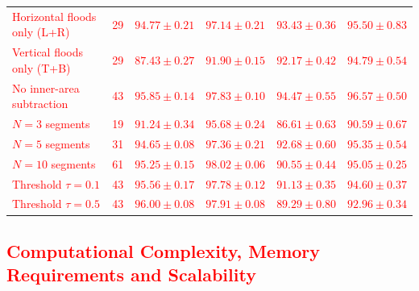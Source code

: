 \documentclass[a4paper,fleqn]{cas-dc}
\begin{document}
\begin{table}
\begin{tabular}{l|c|cc|cc}
        \textcolor{red}{Horizontal floods only (L+R)} & \textcolor{red}{29} & \textcolor{red}{$94.77 \pm 0.21$} & \textcolor{red}{$97.14 \pm 0.21$} & \textcolor{red}{$93.43 \pm 0.36$} & \textcolor{red}{$95.50 \pm 0.83$} \\
        \textcolor{red}{Vertical floods only (T+B)} & \textcolor{red}{29} & \textcolor{red}{$87.43 \pm 0.27$} & \textcolor{red}{$91.90 \pm 0.15$} & \textcolor{red}{$92.17 \pm 0.42$} & \textcolor{red}{$94.79 \pm 0.54$} \\
        \hline
        \textcolor{red}{No inner-area subtraction} & \textcolor{red}{43} & \textcolor{red}{$95.85 \pm 0.14$} & \textcolor{red}{$97.83 \pm 0.10$} & \textcolor{red}{$94.47 \pm 0.55$} & \textcolor{red}{$96.57 \pm 0.50$} \\
        \textcolor{red}{$N = 3$ segments} & \textcolor{red}{19} & \textcolor{red}{$91.24 \pm 0.34$} & \textcolor{red}{$95.68 \pm 0.24$} & \textcolor{red}{$86.61 \pm 0.63$} & \textcolor{red}{$90.59 \pm 0.67$} \\
        \textcolor{red}{$N = 5$ segments} & \textcolor{red}{31} & \textcolor{red}{$94.65 \pm 0.08$} & \textcolor{red}{$97.36 \pm 0.21$} & \textcolor{red}{$92.68 \pm 0.60$} & \textcolor{red}{$95.35 \pm 0.54$} \\
        \textcolor{red}{$N = 10$ segments} & \textcolor{red}{61} & \textcolor{red}{$95.25 \pm 0.15$} & \textcolor{red}{$98.02 \pm 0.06$} & \textcolor{red}{$90.55 \pm 0.44$} & \textcolor{red}{$95.05 \pm 0.25$} \\
        \textcolor{red}{Threshold $\tau = 0.1$} & \textcolor{red}{43} & \textcolor{red}{$95.56 \pm 0.17$} & \textcolor{red}{$97.78 \pm 0.12$} & \textcolor{red}{$91.13 \pm 0.35$} & \textcolor{red}{$94.60 \pm 0.37$} \\
        \textcolor{red}{Threshold $\tau = 0.5$} & \textcolor{red}{43} & \textcolor{red}{$96.00 \pm 0.08$} & \textcolor{red}{$97.91 \pm 0.08$} & \textcolor{red}{$89.29 \pm 0.80$} & \textcolor{red}{$92.96 \pm 0.34$} \\
        \hline
    \end{tabular}
\end{table}

\subsection{\textcolor{red}{Computational Complexity, Memory Requirements and Scalability}}
\end{document}

